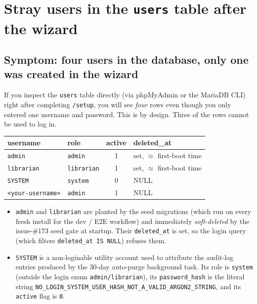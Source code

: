 \section{Stray users in the \texttt{users} table after the wizard}
\label{sec:troubleshoot-seeded-users}

\subsection*{Symptom: four users in the database, only one was created in the wizard}

If you inspect the \texttt{users} table directly (via phpMyAdmin or
the MariaDB CLI) right after completing \texttt{/setup}, you will
see \emph{four} rows even though you only entered one username and
password. This is by design. Three of the rows cannot be used to
log in.

\begin{longtable}{@{} l l c l @{}}
\toprule
\textbf{username} & \textbf{role} & \textbf{active} & \textbf{deleted\_at} \\
\midrule
\endhead
\texttt{admin}     & \texttt{admin}     & 1 & set, $\approx$ first-boot time \\
\texttt{librarian} & \texttt{librarian} & 1 & set, $\approx$ first-boot time \\
\texttt{SYSTEM}    & \texttt{system}    & 0 & NULL \\
\texttt{<your-username>} & \texttt{admin} & 1 & NULL \\
\bottomrule
\end{longtable}

\begin{itemize}
  \item \texttt{admin} and \texttt{librarian} are planted by the
        seed migrations (which run on every fresh install for the
        dev / E2E workflow) and immediately \emph{soft-deleted}
        by the issue-\#173 seed gate at startup. Their
        \texttt{deleted\_at} is set, so the login query (which
        filters \texttt{deleted\_at IS NULL}) refuses them.
  \item \texttt{SYSTEM} is a non-loginable
        utility account used to attribute the audit-log entries
        produced by the 30-day auto-purge background task. Its role
        is \texttt{system} (outside the login enum
        \texttt{admin/librarian}), its \texttt{password\_hash} is
        the literal string
        \texttt{NO\_LOGIN\_SYSTEM\_USER\_HASH\_NOT\_A\_VALID\_ARGON2\_STRING},
        and its \texttt{active} flag is \texttt{0}.
\end{itemize}

